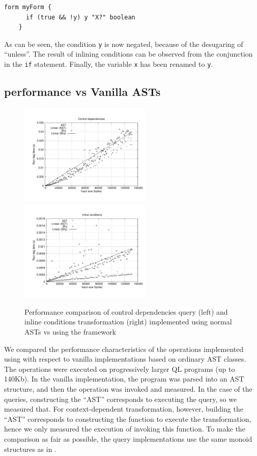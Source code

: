   \begin{lstlisting}[language=ql]
    form myForm {
      if (true && !y) y "X?" boolean
    }
  \end{lstlisting}

As can be seen, the condition \lstinline{y} is now negated, because of the desugaring of ``unless''.
The result of inlining conditions can be observed from the conjunction in the \lstinline[language=ql]{if} statement. Finally, the variable \lstinline{x} has been renamed to \lstinline{y}.
  
\subsection{\name performance vs Vanilla ASTs}

\begin{figure}[t]
  \hspace*{-.1\textwidth}
  \includegraphics[width=0.56\textwidth]{plots/controldeps}
  \includegraphics[width=0.56\textwidth]{plots/inline}
  \caption{Performance comparison of control dependencies query (left) and inline conditions transformation (right) implemented using normal ASTs vs using the \name framework\label{FIG:performance}}
\end{figure}

We compared the performance characteristics of the operations implemented using \name with respect to vanilla implementations based on ordinary AST classes.
The operations were executed on progressively larger QL programs (up to 140Kb).
In the vanilla implementation, the program was parsed into an AST structure, and then the operation was invoked and measured.
In the case of the \name queries, constructing the ``AST'' corresponds to executing the query, so we measured that.
For context-dependent transformation, however, building the ``AST'' corresponds to constructing the function to execute the transformation, hence we only measured the execution of invoking this function. 
To make the comparison as fair as possible, the query implementations use the same monoid structures as in \name.

